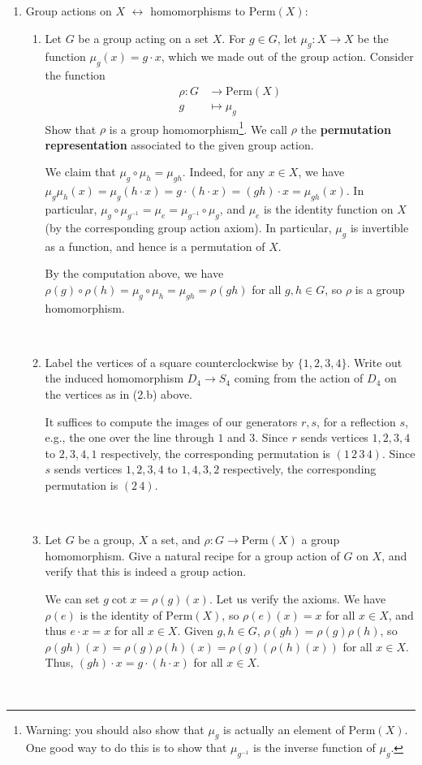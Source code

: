 \documentclass[12pt]{amsart}
\newcommand{\Bold}[1]{\contour{black}{#1}}
\newcommand{\solution}[1]{\ifthenelse {\equal{\displaysol}{1}} {\begin{framed}{\color{meretale}\noindent #1}\end{framed}} { \ }}
\newcommand\itemA{\stepcounter{enumi}\item[{\Bold{(\theenumi)}}]}
\newcommand\itema{\stepcounter{enumii}\item[{\Bold{(\theenumii)}}]}
\begin{document}
\begin{enumerate}
\


\itemA Group actions on $X$ $\longleftrightarrow$ homomorphisms to $\mathrm{Perm}(X)$:
\begin{enumerate}
\itema Let $G$ be a group acting on a set $X$. For $g\in G$, let $\mu_g: X\to X$ be the function $\mu_g(x) = g\cdot x$, which we made out of the group action. Consider the function 
\[ \begin{aligned} \rho: G &\rightarrow \mathrm{Perm}(X)  \\ g &\mapsto \mu_g \end{aligned}\]
Show that $\rho$ is a group homomorphism\footnote{Warning: you should also show that $\mu_g$ is actually an element of $\mathrm{Perm}(X)$. One good way to do this is to show that $\mu_{g^{-1}}$ is the inverse function of $\mu_g$.}.
We call $\rho$ the \textbf{permutation representation} associated to the given group action.
\solution{We claim that $\mu_g \circ \mu_h = \mu_{gh}$. Indeed, for any $x\in X$, we have $\mu_g \mu_h (x) = \mu_g (h\cdot x) = g\cdot (h\cdot x) = (gh)\cdot x = \mu_{gh}(x)$. In particular, $\mu_g \circ \mu_{g^{-1}} = \mu_e = \mu_{g^{-1}} \circ \mu_g$, and $\mu_e$ is the identity function on $X$ (by the corresponding group action axiom). In particular, $\mu_g$ is invertible as a function, and hence is a permutation of $X$.

By the computation above, we have $\rho(g) \circ \rho(h) = \mu_g \circ \mu_h = \mu_{gh} = \rho(gh)$ for all $g,h\in G$, so $\rho$ is a group homomorphism.}
\itema Label the vertices of a square counterclockwise by $\{1,2,3,4\}$. Write out the induced homomorphism $D_4 \to S_4$ coming from the action of $D_4$ on the vertices as in (2.b) above.
\solution{It suffices to compute the images of our generators $r,s$, for a reflection $s$, e.g., the one over the line through $1$ and $3$. Since $r$ sends vertices $1,2,3,4$ to $2,3,4,1$ respectively, the corresponding permutation is $(1 \, 2\, 3\, 4)$. Since
$s$ sends vertices $1,2,3,4$ to $1,4,3,2$ respectively, the corresponding permutation is $(2\, 4)$.}
\itema Let $G$ be a group, $X$ a set, and $\rho:G\to \mathrm{Perm}(X)$ a group homomorphism. Give a natural recipe for a group action of $G$ on $X$, and verify that this is indeed a group action.
\solution{We can set $g\cot x = \rho(g)(x)$. Let us verify the axioms. We have $\rho(e)$ is the identity of $\mathrm{Perm}(X)$, so $\rho(e)(x)=x$ for all $x\in X$, and thus $e\cdot x= x$ for all $x\in X$. Given $g,h\in G$, $\rho(gh) = \rho(g)\rho(h)$, so $\rho(gh)(x) = \rho(g) \rho(h) (x) = \rho(g)(\rho(h)(x))$ for all $x\in X$. Thus, $(gh)\cdot x = g \cdot(h\cdot x)$ for all $x\in X$.}
\end{enumerate}


\end{enumerate}
\end{document}
